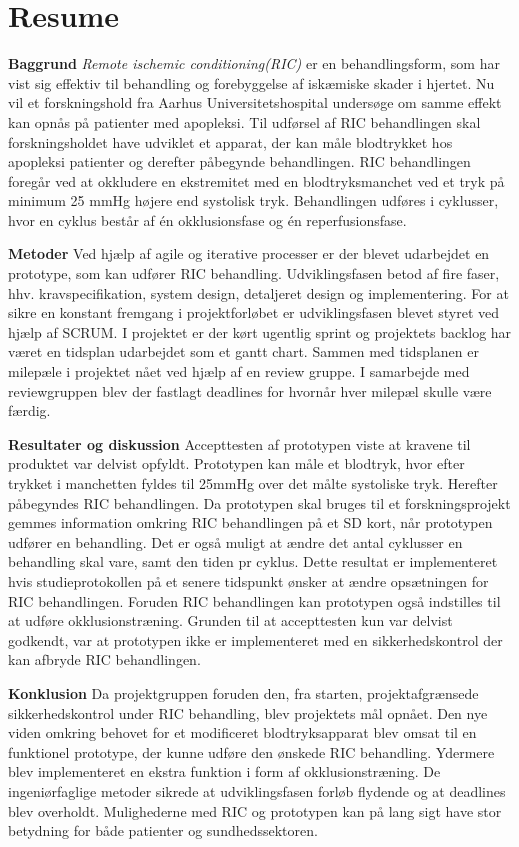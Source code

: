\chapter*{Resume}
\textbf{Baggrund}
\textit{Remote ischemic conditioning(RIC)} er en behandlingsform, som har vist sig effektiv til behandling og forebyggelse af iskæmiske skader i hjertet. Nu vil et forskningshold fra Aarhus Universitetshospital undersøge om samme effekt kan opnås på patienter med apopleksi. Til udførsel af RIC behandlingen skal forskningsholdet have udviklet et apparat, der kan måle blodtrykket hos apopleksi patienter og derefter påbegynde behandlingen. RIC behandlingen foregår ved at okkludere en ekstremitet med en blodtryksmanchet ved et tryk på minimum 25 mmHg højere end systolisk tryk. Behandlingen udføres i cyklusser, hvor en cyklus består af én okklusionsfase og én reperfusionsfase. 

\textbf{Metoder}
Ved hjælp af agile og iterative processer er der blevet udarbejdet en prototype, som kan udfører RIC behandling. Udviklingsfasen betod af fire faser, hhv. kravspecifikation, system design, detaljeret design og implementering. For at sikre en konstant fremgang i projektforløbet er udviklingsfasen blevet styret ved hjælp af SCRUM. I projektet er der kørt ugentlig sprint og projektets backlog har været en tidsplan udarbejdet som et gantt chart. Sammen med tidsplanen er milepæle i projektet nået ved hjælp af en review gruppe. I samarbejde med reviewgruppen blev der fastlagt deadlines for hvornår hver milepæl skulle være færdig.

\textbf{Resultater og diskussion}
Accepttesten af prototypen viste at kravene til produktet var delvist opfyldt. Prototypen kan måle et blodtryk, hvor efter trykket i manchetten fyldes til 25mmHg over det målte systoliske tryk. Herefter påbegyndes RIC behandlingen. Da prototypen skal bruges til et forskningsprojekt gemmes information omkring RIC behandlingen på et SD kort, når prototypen udfører en behandling. Det er også muligt at ændre det antal cyklusser en behandling skal vare, samt den tiden pr cyklus. Dette resultat er implementeret hvis studieprotokollen på et senere tidspunkt ønsker at ændre opsætningen for RIC behandlingen. Foruden RIC behandlingen kan prototypen også indstilles til at udføre okklusionstræning. Grunden til at accepttesten kun var delvist godkendt, var at prototypen ikke er implementeret med en sikkerhedskontrol der kan afbryde RIC behandlingen. 

\textbf{Konklusion}
Da projektgruppen foruden den, fra starten, projektafgrænsede sikkerhedskontrol under RIC behandling, blev projektets mål opnået. Den nye viden omkring behovet for et modificeret blodtryksapparat blev omsat til en funktionel prototype, der kunne udføre den ønskede RIC behandling. Ydermere blev implementeret en ekstra funktion i form af okklusionstræning. De ingeniørfaglige metoder sikrede at udviklingsfasen forløb flydende og at deadlines blev overholdt. Mulighederne med RIC og prototypen kan på lang sigt have stor betydning for både patienter og sundhedssektoren.